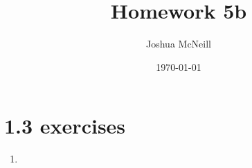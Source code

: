 \documentclass{article}
\title{Homework 5b}
\author{Joshua McNeill}
\date{\today}
\begin{document}
  \maketitle
  \section{1.3 exercises}
    \begin{enumerate}
      \item 
    \end{enumerate}
\end{document}
